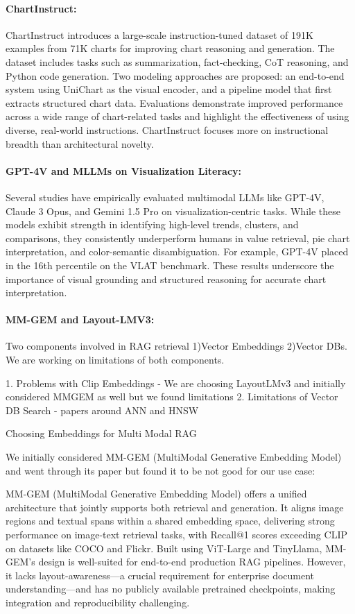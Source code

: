 \documentclass[11pt]{article}
\begin{document}
\paragraph{ChartInstruct:} ChartInstruct introduces a large-scale instruction-tuned dataset of 191K examples from 71K charts for improving chart reasoning and generation. The dataset includes tasks such as summarization, fact-checking, CoT reasoning, and Python code generation. Two modeling approaches are proposed: an end-to-end system using UniChart as the visual encoder, and a pipeline model that first extracts structured chart data. Evaluations demonstrate improved performance across a wide range of chart-related tasks and highlight the effectiveness of using diverse, real-world instructions. ChartInstruct focuses more on instructional breadth than architectural novelty.

\paragraph{GPT-4V and MLLMs on Visualization Literacy:} Several studies have empirically evaluated multimodal LLMs like GPT-4V, Claude 3 Opus, and Gemini 1.5 Pro on visualization-centric tasks. While these models exhibit strength in identifying high-level trends, clusters, and comparisons, they consistently underperform humans in value retrieval, pie chart interpretation, and color-semantic disambiguation. For example, GPT-4V placed in the 16th percentile on the VLAT benchmark. These results underscore the importance of visual grounding and structured reasoning for accurate chart interpretation.

\paragraph{MM-GEM and Layout-LMV3:}

Two components involved in RAG retrieval 1)Vector Embeddings 2)Vector DBs. We are working on limitations of both components.

1. Problems with Clip Embeddings - We are choosing LayoutLMv3 and initially considered MMGEM as well but we found limitations
2. Limitations of Vector DB Search - papers around ANN and HNSW

Choosing Embeddings for Multi Modal RAG

We initially considered MM-GEM (MultiModal Generative Embedding Model) and went through its paper but found it to be not good for our use case:

MM-GEM (MultiModal Generative Embedding Model) offers a unified architecture that jointly supports both retrieval and generation. It aligns image regions and textual spans within a shared embedding space, delivering strong performance on image-text retrieval tasks, with Recall@1 scores exceeding CLIP on datasets like COCO and Flickr. Built using ViT-Large and TinyLlama, MM-GEM's design is well-suited for end-to-end production RAG pipelines. However, it lacks layout-awareness—a crucial requirement for enterprise document understanding—and has no publicly available pretrained checkpoints, making integration and reproducibility challenging.
\end{document}
